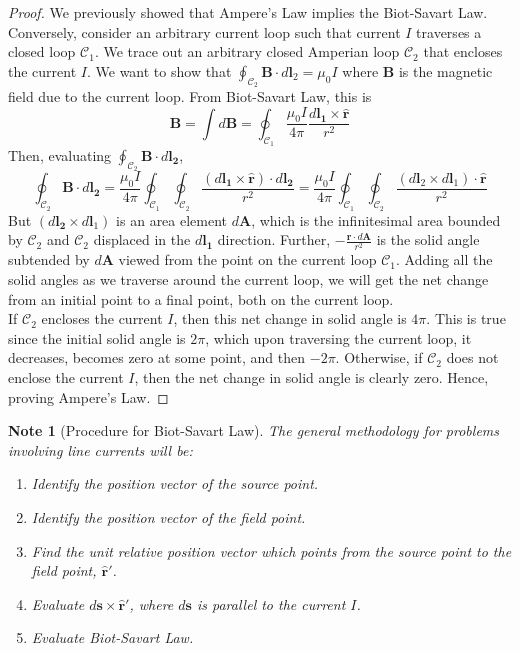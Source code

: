 \documentclass[a4paper]{article}
\newtheorem{Note}{Note}[section]
\theoremstyle{new}
\begin{document}
\begin{proof}
We previously showed that Ampere's Law implies the Biot-Savart Law. Conversely, consider an arbitrary current loop such that current $I$ traverses a closed loop $\mathcal{C}_1$. We trace out an arbitrary closed Amperian loop $\mathcal{C}_2$ that encloses the current $I$. We want to show that $\oint_{\mathcal{C}_2}\mathbf{B}\cdot d\mathbf{l}_2=\mu_0I$ where $\mathbf{B}$ is the magnetic field due to the current loop. From Biot-Savart Law, this is
$$\mathbf{B}=\int d\mathbf{B}=\oint_{\mathcal{C}_1}\frac{\mu_0I}{4\pi}\frac{d\mathbf{l_1}\times\mathbf{\hat{r}}}{r^2}$$
Then, evaluating $\oint_{\mathcal{C}_2}\mathbf{B}\cdot d\mathbf{l_2}$,
$$\oint_{\mathcal{C}_2}\mathbf{B}\cdot d\mathbf{l_2}=\frac{\mu_0I}{4\pi}\oint_{\mathcal{C}_1}\oint_{\mathcal{C}_2}\frac{(d\mathbf{l_1}\times\mathbf{\hat{r}})\cdot d\mathbf{l_2}}{r^2}=\frac{\mu_0I}{4\pi}\oint_{\mathcal{C}_1}\oint_{\mathcal{C}_2}\frac{(d\mathbf{l}_2\times d\mathbf{l}_1)\cdot\mathbf{\hat{r}}}{r^2}$$
But $(d\mathbf{l_2}\times d\mathbf{l}_1)$ is an area element $d\mathbf{A}$, which is the infinitesimal area bounded by $\mathcal{C}_2$ and $\mathcal{C}_2$ displaced in the $d\mathbf{l_1}$ direction. Further, $-\frac{\mathbf{\hat{r}}\cdot d\mathbf{A}}{r^2}$ is the solid angle subtended by $d\mathbf{A}$ viewed from the point on the current loop $\mathcal{C}_1$. Adding all the solid angles as we traverse around the current loop, we will get the net change from an initial point to a final point, both on the current loop.\\[5pt]
If $\mathcal{C}_2$ encloses the current $I$, then this net change in solid angle is $4\pi$. This is true since the initial solid angle is $2\pi$, which upon traversing the current loop, it decreases, becomes zero at some point, and then $-2\pi$. Otherwise, if $\mathcal{C}_2$ does not enclose the current $I$, then the net change in solid angle is clearly zero. Hence, proving Ampere's Law.
\end{proof}
\begin{Note}[Procedure for Biot-Savart Law]
The general methodology for problems involving line currents will be:
\begin{enumerate}
    \item Identify the position vector of the source point.
    \item Identify the position vector of the field point.
    \item Find the unit relative position vector which points from the source point to the field point, $\mathbf{\hat{r}'}$.
    \item Evaluate  $d\mathbf{s}\times\mathbf{\hat{r}'}$, where $d\mathbf{s}$ is parallel to the current $I$.
    \item Evaluate Biot-Savart Law.
\end{enumerate}
\end{Note}
\end{document}
